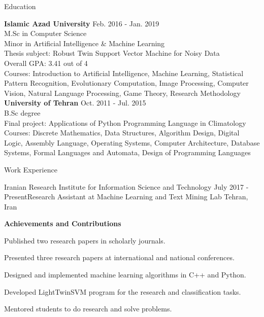 \documentclass{resume} %
\begin{document}
\begin{rSection}{Education}

{\bf Islamic Azad University} \hfill {Feb. 2016 - Jan. 2019} \\ 
M.Sc in Computer Science  \\
Minor in Artificial Intelligence \& Machine Learning  \smallskip \\
Thesis subject: Robust Twin Support Vector Machine for Noisy Data \\
Overall GPA: 3.41 out of 4 \\
Courses: Introduction to Artificial Intelligence, Machine Learning, Statistical Pattern Recognition, Evolutionary Computation, Image Processing, Computer Vision, Natural Language Processing, Game Theory, Research Methodology \\

{\bf University of Tehran} \hfill {Oct. 2011 - Jul. 2015} \\
B.Sc degree \\
Final project: Applications of Python Programming Language in Climatology \\ 
Courses: Discrete Mathematics, Data Structures, Algorithm Design, Digital Logic, Assembly Language, Operating Systems, Computer Architecture, Database Systems, Formal Languages and Automata, Design of Programming Languages
\end{rSection}


\begin{rSection}{Work Experience}

\begin{rSubsection}{Iranian Research Institute for Information Science and Technology }{July 2017 - Present}{Research Assistant at Machine Learning and Text Mining Lab }{Tehran, Iran}
	
\textbf{Achievements and Contributions}
\item Published two research papers in scholarly journals.
\item Presented three research papers at international and national conferences.
\item Designed and implemented machine learning algorithms in C++ and Python.
\item Developed LightTwinSVM program for the research and classification tasks.
\item Mentored students to do research and solve problems.
\end{rSubsection}


\end{rSection}
\end{document}
